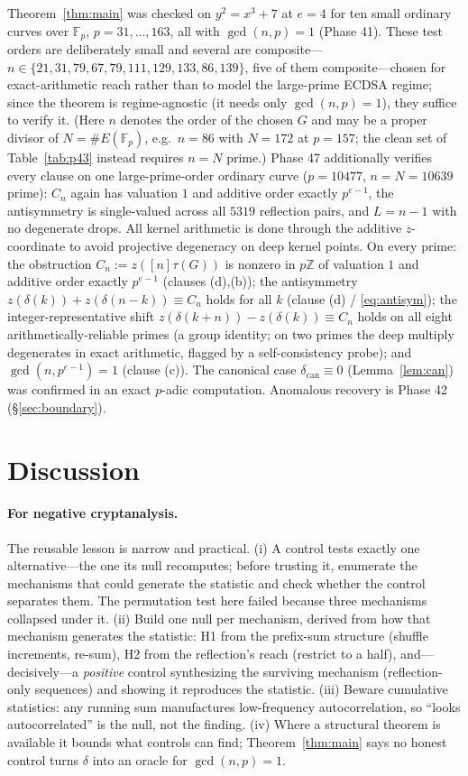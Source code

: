 \documentclass[11pt]{article}
\theoremstyle{definition}
\newcommand{\Fp}{\mathbb{F}_p}
\newcommand{\Z}{\mathbb{Z}}
\begin{document}
Theorem~\ref{thm:main} was checked on $y^2=x^3+7$ at $e=4$ for ten
small ordinary curves over $\Fp$, $p=31,\dots,163$, all with
$\gcd(n,p)=1$ (Phase 41). These test orders are deliberately small and
several are composite---$n\in\{21,31,79,67,79,111,129,133,86,139\}$, five
of them composite---chosen for exact-arithmetic reach rather than to model
the large-prime ECDSA regime; since the theorem is regime-agnostic (it
needs only $\gcd(n,p)=1$), they suffice to verify it. (Here $n$ denotes
the order of the chosen $G$ and may be a proper divisor of $N=\#E(\Fp)$,
e.g.\ $n=86$ with $N=172$ at $p=157$; the clean set of
Table~\ref{tab:p43} instead requires $n=N$ prime.) Phase 47 additionally
verifies every clause on one large-prime-order ordinary curve
($p=10477$, $n=N=10639$ prime): $C_n$ again has valuation $1$ and
additive order exactly $p^{e-1}$, the antisymmetry is single-valued
across all $5319$ reflection pairs, and $L=n-1$ with no degenerate
drops. All kernel arithmetic is done through the
additive $z$-coordinate to avoid projective degeneracy on deep kernel
points. On every prime: the
obstruction $C_n:=z([n]\tau(G))$ is nonzero in $p\Z$ of valuation $1$ and
additive order exactly $p^{e-1}$ (clauses (d),(b)); the antisymmetry
$z(\delta(k))+z(\delta(n-k))\equiv C_n$ holds for all $k$ (clause (d) /
\eqref{eq:antisym}); the integer-representative shift
$z(\delta(k+n))-z(\delta(k))\equiv C_n$ holds on all eight
arithmetically-reliable primes (a group identity; on two primes the deep
multiply degenerates in exact arithmetic, flagged by a self-consistency
probe); and $\gcd(n,p^{e-1})=1$ (clause (c)). The canonical case
$\delta_{\mathrm{can}}\equiv 0$ (Lemma~\ref{lem:can}) was confirmed in an
exact $p$-adic computation. Anomalous recovery is Phase 42
(\S\ref{sec:boundary}).

\section{Discussion}\label{sec:discussion}

\paragraph{For negative cryptanalysis.} The reusable lesson is narrow and
practical. (i) A control tests exactly one alternative---the one its null
recomputes; before trusting it, enumerate the mechanisms that could
generate the statistic and check whether the control separates them. The
permutation test here failed because three mechanisms collapsed under it.
(ii) Build one null per mechanism, derived from how that mechanism
generates the statistic: H1 from the prefix-sum structure (shuffle
increments, re-sum), H2 from the reflection's reach (restrict to a half),
and---decisively---a \emph{positive} control synthesizing the surviving
mechanism (reflection-only sequences) and showing it reproduces the
statistic. (iii) Beware cumulative statistics: any running sum
manufactures low-frequency autocorrelation, so ``looks autocorrelated''
is the null, not the finding. (iv) Where a structural theorem is
available it bounds what controls can find; Theorem~\ref{thm:main} says no
honest control turns $\delta$ into an oracle for $\gcd(n,p)=1$.
\end{document}

